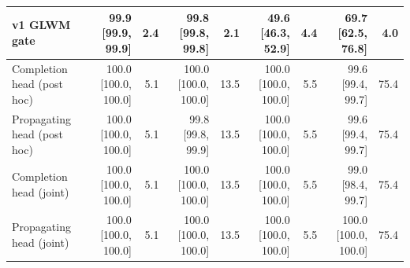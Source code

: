 \begin{tabular}{lrrrrrrrr}
v1 GLWM gate & 99.9 \tiny{[99.9, 99.9]} & 2.4 & 99.8 \tiny{[99.8, 99.8]} & 2.1 & 49.6 \tiny{[46.3, 52.9]} & 4.4 & 69.7 \tiny{[62.5, 76.8]} & 4.0 \\
\midrule
Completion head (post hoc) & 100.0 \tiny{[100.0, 100.0]} & 5.1 & 100.0 \tiny{[100.0, 100.0]} & 13.5 & 100.0 \tiny{[100.0, 100.0]} & 5.5 & 99.6 \tiny{[99.4, 99.7]} & 75.4 \\
Propagating head (post hoc) & 100.0 \tiny{[100.0, 100.0]} & 5.1 & 99.8 \tiny{[99.8, 99.9]} & 13.5 & 100.0 \tiny{[100.0, 100.0]} & 5.5 & 99.6 \tiny{[99.4, 99.7]} & 75.4 \\
Completion head (joint) & 100.0 \tiny{[100.0, 100.0]} & 5.1 & 100.0 \tiny{[100.0, 100.0]} & 13.5 & 100.0 \tiny{[100.0, 100.0]} & 5.5 & 99.0 \tiny{[98.4, 99.7]} & 75.4 \\
Propagating head (joint) & 100.0 \tiny{[100.0, 100.0]} & 5.1 & 100.0 \tiny{[100.0, 100.0]} & 13.5 & 100.0 \tiny{[100.0, 100.0]} & 5.5 & 100.0 \tiny{[100.0, 100.0]} & 75.4 \\
\bottomrule
\end{tabular}